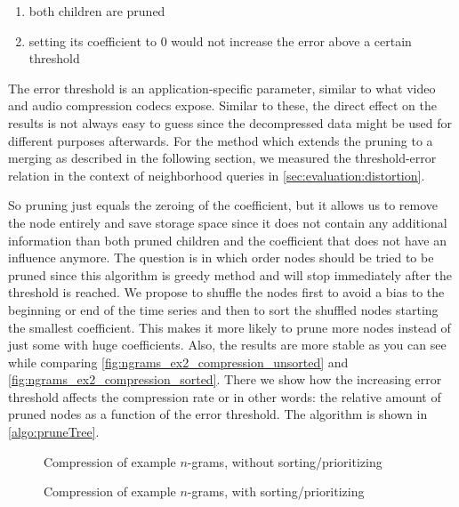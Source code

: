 \begin{enumerate}
    \item both children are pruned
    \item setting its coefficient to $0$ would not increase the error above a certain threshold
\end{enumerate}

The error threshold is an application-specific parameter, similar to what video and audio compression codecs expose. Similar to these, the direct effect on the results is not always easy to guess since the decompressed data might be used for different purposes afterwards. For the method which extends the pruning to a merging as described in the following section, we measured the threshold-error relation in the context of neighborhood queries in \autoref{sec:evaluation:distortion}.

So pruning just equals the zeroing of the coefficient, but it allows us to remove the node entirely and save storage space since it does not contain any additional information than both pruned children and the coefficient that does not have an influence anymore. The question is in which order nodes should be tried to be pruned since this algorithm is greedy method and will stop immediately after the threshold is reached. We propose to shuffle the nodes first to avoid a bias to the beginning or end of the time series and then to sort the shuffled nodes starting the smallest coefficient. This makes it more likely to prune more nodes instead of just some with huge coefficients. Also, the results are more stable as you can see while comparing \autoref{fig:ngrams_ex2_compression_unsorted} and \autoref{fig:ngrams_ex2_compression_sorted}. There we show how the increasing error threshold affects the compression rate or in other words: the relative amount of pruned nodes as a function of the error threshold. The algorithm is shown in \autoref{algo:pruneTree}.

\begin{figure}
    \centering
    
    \caption{Compression of example $n$-grams, without sorting\slash{}prioritizing}\label{fig:ngrams_ex2_compression_unsorted}
\end{figure}

\begin{figure}
    \centering
    
    \caption{Compression of example $n$-grams, with sorting\slash{}prioritizing}\label{fig:ngrams_ex2_compression_sorted}
\end{figure}



